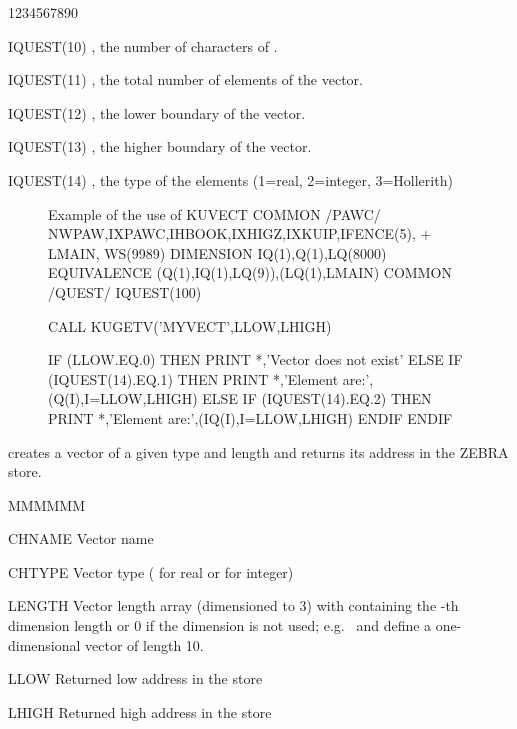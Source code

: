 \begin{DLtt}{1234567890}
\item[IQUEST(10)] , the number of characters of .
\item[IQUEST(11)] , the total number of elements of the vector.
\item[IQUEST(12)] , the lower boundary of the vector.
\item[IQUEST(13)] , the higher boundary of the vector.
\item[IQUEST(14)] , the type of the elements (1=real, 2=integer, 3=Hollerith)
\end{DLtt}

\begin{figure}[tb]
\begin{XMPt}{Example of the use of KUVECT}
      COMMON /PAWC/ NWPAW,IXPAWC,IHBOOK,IXHIGZ,IXKUIP,IFENCE(5),
     +              LMAIN, WS(9989)
      DIMENSION IQ(1),Q(1),LQ(8000)
      EQUIVALENCE (Q(1),IQ(1),LQ(9)),(LQ(1),LMAIN)
      COMMON /QUEST/ IQUEST(100)
 
      CALL KUGETV('MYVECT',LLOW,LHIGH)
 
      IF (LLOW.EQ.0) THEN
        PRINT *,'Vector does not exist'
      ELSE
        IF (IQUEST(14).EQ.1) THEN
          PRINT *,'Element are:',(Q(I),I=LLOW,LHIGH)
        ELSE IF (IQUEST(14).EQ.2) THEN
          PRINT *,'Element are:',(IQ(I),I=LLOW,LHIGH)
        ENDIF
      ENDIF
\end{XMPt}
\end{figure}


\Action creates a \KUIP{} vector of a given type and length 
and returns its address in the ZEBRA store.

\Pdesc\begin{DLtt}{MMMMMM}
\item[CHNAME] Vector name
\item[CHTYPE] Vector type ( for real or  for integer)
\item[LENGTH] Vector length array (dimensioned to 3) with  containing
the -th dimension length or 0 if the dimension is not used;
e.g.\  and  
define a one-dimensional vector of length 10.
\item[LLOW] Returned low address in the  store
\item[LHIGH] Returned high address in the  store
\end{DLtt}

